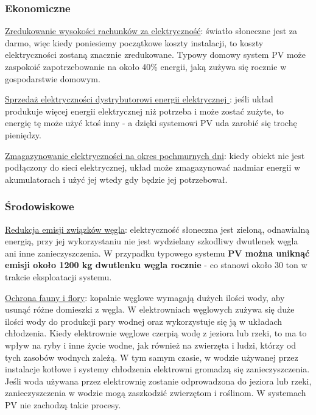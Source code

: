 \documentclass[12pt,a4paper]{article}
\begin{document}
\subsubsection{Ekonomiczne}

\underline{Zredukowanie wysokości rachunków za elektryczność}: 
światło słoneczne jest za darmo, więc kiedy poniesiemy początkowe koszty 
instalacji, to koszty elektryczności zostaną znacznie zredukowane. 
Typowy domowy system PV może zaspokoić zapotrzebowanie na około 40\% 
energii, jaką zużywa się rocznie w gospodarstwie domowym. 

\underline{Sprzedaż elektryczności dystrybutorowi energii elektrycznej
}: jeśli układ produkuje więcej energii elektrycznej niż potrzeba i 
może zostać zużyte, to energię tę może użyć ktoś inny - a dzięki 
systemowi PV uda zarobić się trochę pieniędzy. 

\underline{Zmagazynowanie elektryczności na okres pochmurnych dni}: 
kiedy obiekt nie jest podłączony do sieci elektrycznej, układ może 
zmagazynować nadmiar energii w akumulatorach i użyć jej wtedy gdy będzie 
jej potrzebował. 

\subsubsection{Środowiskowe}

\underline{Redukcja emisji związków węgla}: elektryczność słoneczna 
jest zieloną, odnawialną energią, przy jej wykorzystaniu nie jest 
wydzielany szkodliwy dwutlenek węgla ani inne zanieczyszczenia. W 
przypadku typowego systemu \textbf{PV można uniknąć emisji około 1200 
kg dwutlenku węgla rocznie} - co stanowi około 30 ton w trakcie 
eksploatacji systemu. 

\underline{Ochrona fauny i flory}: kopalnie węglowe wymagają dużych 
ilości wody, aby usunąć różne domieszki z węgla. W elektrowniach 
węglowych zużywa się duże ilości wody do produkcji pary wodnej oraz 
wykorzystuje się ją w układach chłodzenia. Kiedy elektrownie węglowe 
czerpią wodę z jeziora lub rzeki, to ma to wpływ na ryby i inne życie 
wodne, jak również na zwierzęta i ludzi, którzy od tych zasobów wodnych 
zależą. W tym samym czasie, w wodzie używanej przez instalacje kotłowe i 
systemy chłodzenia elektrowni gromadzą się zanieczyszczenia. Jeśli woda 
używana przez elektrownię zostanie odprowadzona do jeziora lub rzeki, 
zanieczyszczenia w wodzie mogą zaszkodzić zwierzętom i roślinom. W 
systemach PV nie zachodzą takie procesy. 
\end{document}
